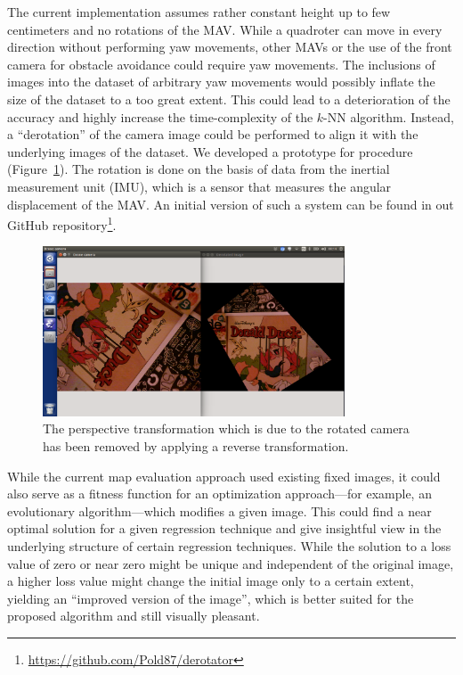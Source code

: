 \documentclass[11pt]{report}
\begin{document}
The current implementation assumes rather constant height up to few
centimeters and no rotations of the MAV. While a quadroter can move in
every direction without performing yaw movements, other MAVs or the
use of the front camera for obstacle avoidance could require yaw
movements. The inclusions of images into the dataset of arbitrary yaw
movements would possibly inflate the size of the dataset to a too
great extent. This could lead to a deterioration of the accuracy and
highly increase the time-complexity of the $k$-NN algorithm. Instead,
a ``derotation'' of the camera image could be performed to align it
with the underlying images of the dataset. We developed a prototype
for procedure (Figure~\ref{fig:rotation}). The rotation is done on the
basis of data from the inertial measurement unit (IMU), which is a
sensor that measures the angular displacement of the MAV. An initial
version of such a system can be found in out GitHub
repository\footnote{\url{https://github.com/Pold87/derotator}}.

\begin{figure}[h]
  \centering
  \includegraphics[width=0.8\textwidth]{derotator}
  \caption{The perspective transformation which is due to the rotated
    camera has been removed by applying a reverse transformation.}
  \label{fig:rotation}
\end{figure}

While the current map evaluation approach used existing fixed images,
it could also serve as a fitness function for an optimization
approach---for example, an evolutionary algorithm---which modifies a
given image. This could find a near optimal solution for a given
regression technique and give insightful view in the underlying
structure of certain regression techniques. While the solution to a
loss value of zero or near zero might be unique and independent of the
original image, a higher loss value might change the initial image
only to a certain extent, yielding an ``improved version of the
image'', which is better suited for the proposed algorithm and still
visually pleasant.
\end{document}
